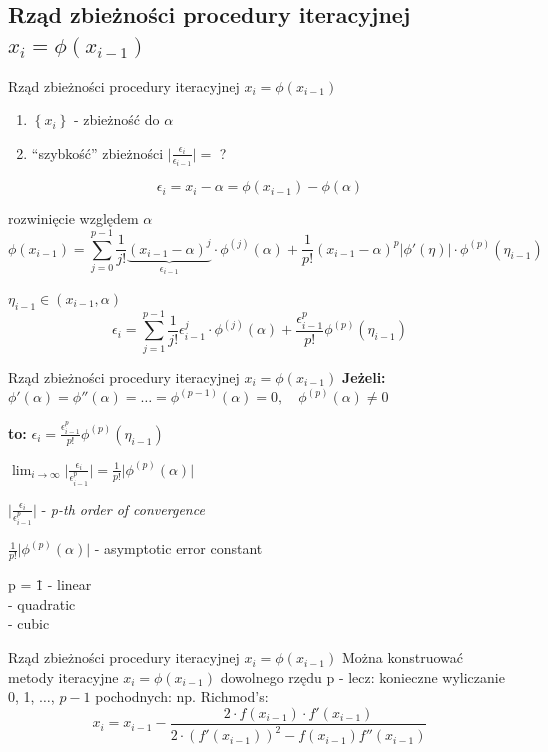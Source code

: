 \subsection{Rząd zbieżności procedury iteracyjnej $x_{i} = \phi(x_{i-1})$}
\begin{frame}{Rząd zbieżności procedury iteracyjnej $x_{i} = \phi(x_{i-1})$}
	\begin{enumerate}
		\item $\left\{x_{i}\right\} $ - zbieżność do $\alpha$
		\item ``szybkość'' zbieżności $\lvert \frac{\epsilon_{i}}{\epsilon_{i-1}} \rvert = $ ?
	\end{enumerate}
	\[
		\epsilon_{i} = x_{i} - \alpha = \phi(x_{i-1}) - \phi(\alpha)
	\]
	
	rozwinięcie względem $\alpha$
	\[
		\phi(x_{i-1}) = \sum_{j=0}^{p-1} \frac{1}{j!} \underbrace{(x_{i-1} - \alpha)^{j}}_{\epsilon_{i-1}} \cdot \phi^{(j)}(\alpha) + \frac{1}{p!}(x_{i-1} - \alpha)^{p} \lvert \phi'(\eta) \rvert\cdot \phi^{(p)}(\eta_{i-1})
	\]
	
	$\eta_{i-1} \in (x_{i-1}, \alpha)$
	\[
		\epsilon_{i} = \sum_{j=1}^{p-1}\frac{1}{j!} \epsilon_{i-1}^{j} \cdot \phi^{(j)}(\alpha) + \frac{\epsilon_{i-1}^{p}}{p!} \phi^{(p)}(\eta_{i-1})
	\]
\end{frame}
\begin{frame}{Rząd zbieżności procedury iteracyjnej $x_{i} = \phi(x_{i-1})$}
	\textbf{Jeżeli: } $\phi'(\alpha) = \phi''(\alpha) = \ldots = \phi^{(p-1)}(\alpha) = 0,\quad \phi^{(p)}(\alpha) \neq 0$\linebreak
	
	\textbf{to: } $\epsilon_{i} = \frac{\epsilon_{i-1}^{p}}{p!} \phi^{(p)}(\eta_{i-1})$\linebreak
	
	$\lim_{i \rightarrow \infty} \lvert \frac{\epsilon_{i}}{\epsilon_{i-1}^{p}} \rvert = \frac{1}{p!} \lvert \phi^{(p)}(\alpha) \rvert$\linebreak
	
	$\lvert \frac{\epsilon_{i}}{\epsilon_{i-1}^{p}} \rvert$ - \textit{p-th order of convergence}\linebreak
	
	$\frac{1}{p!} \lvert \phi^{(p)}(\alpha) \rvert$ - asymptotic error constant
	\begin{tabbing}
		p = \= 1 - linear\\
		 - quadratic\\
		 - cubic
	\end{tabbing}
	
\end{frame}
\begin{frame}{Rząd zbieżności procedury iteracyjnej $x_{i} = \phi(x_{i-1})$}
	Można konstruować metody iteracyjne $x_{i} = \phi(x_{i-1})$ dowolnego rzędu p - lecz: konieczne wyliczanie 0, 1, $\ldots$, $p-1$ pochodnych:\linebreak
	np. Richmod's:
	\[
	x_{i} = x_{i-1} - \frac{2 \cdot f(x_{i-1}) \cdot f'(x_{i-1})}{2 \cdot (f'(x_{i-1}))^{2} - f(x_{i-1}) f''(x_{i-1})}
	\]
\end{frame}